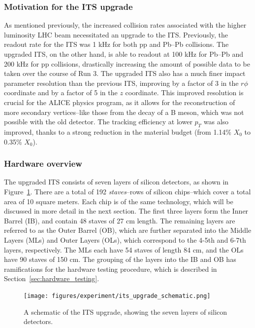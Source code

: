 \subsubsection{Motivation for the ITS upgrade}
As mentioned previously, the increased collision rates associated with the higher luminosity LHC beam necessitated an upgrade to the ITS. Previously, the readout rate for the ITS was 1 kHz for both pp and Pb--Pb collisions. The upgraded ITS, on the other hand, is able to readout at 100 kHz for Pb--Pb and 200 kHz for pp collisions, drastically increasing the amount of possible data to be taken over the course of Run 3. The upgraded ITS also has a much finer impact parameter resolution than the previous ITS, improving by a factor of 3 in the $r\phi$ coordinate and by a factor of 5 in the $z$ coordinate. This improved resolution is crucial for the ALICE physics program, as it allows for the reconstruction of more secondary vertices--like those from the decay of a B meson, which was not possible with the old detector. The tracking efficiency at lower $p_T$ was also improved, thanks to a strong reduction in the material budget (from 1.14\% $X_0$ to 0.35\% $X_0$).


\subsubsection{Hardware overview}
The upgraded ITS consists of seven layers of silicon detectors, as shown in Figure~\ref{fig:its_upgrade_schematic}. There are a total of 192 \textit{staves}--rows of silicon chips--which cover a total area of 10 square meters. Each chip is of the same technology, which will be discussed in more detail in the next section. The first three layers form the Inner Barrel (IB), and contain 48 staves of 27 cm length. The remaining layers are referred to as the Outer Barrel (OB), which are further separated into the Middle Layers (MLs) and Outer Layers (OLs), which correspond to the 4-5th and 6-7th layers, respectively. The MLs each have 54 staves of length 84 cm, and the OLs have 90 staves of 150 cm. The grouping of the layers into the IB and OB has ramifications for the hardware testing procedure, which is described in Section~\ref{sec:hardware_testing}.

\begin{figure}
    \centering
    \texttt{[image: figures/experiment/its\_upgrade\_schematic.png]}
    \caption{A schematic of the ITS upgrade, showing the seven layers of silicon detectors.}
    \label{fig:its_upgrade_schematic}
\end{figure}


